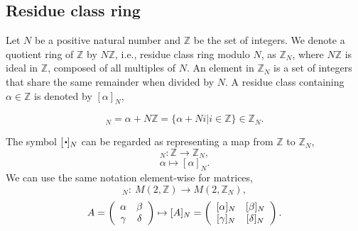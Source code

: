 \documentclass[12pt]{iopart}
\newcommand{\sbt}{\,\begin{picture}(-1,1)(-1,-3)\circle*{2}\end{picture}\ }
\newcommand{\deq}{\stackrel{\rm{\tiny def}}{=}}
\begin{document}
%

\subsection{Residue class ring}
Let \(N\) be a positive natural number and \(\mathbb Z\) be the set of integers.
We denote a quotient ring of \(\mathbb Z\) by \(N\mathbb Z\),
i.e., residue class ring modulo \(N\),
as \(\mathbb Z_N\),
where \(N\mathbb Z\) is ideal in \(\mathbb Z\), composed of
all multiples of \(N\).
%
An element in \(\mathbb Z_N\) is a set of integers that share the same remainder
when divided by \(N\).
A residue class containing \(\alpha\in\mathbb Z\) is denoted by \([\alpha]_N\),

\begin{equation}
[\alpha]_N=\alpha+N\mathbb Z=\{\alpha+Ni|i\in\mathbb Z\}\in\mathbb Z_N.
\end{equation}

The symbol \([\sbt]_N\) can be regarded as representing a map from \(\mathbb Z\) to \(\mathbb Z_N\),
\begin{equation}
[\sbt]_N: \mathbb Z\longrightarrow\mathbb Z_N,
\end{equation}
\begin{equation}
\alpha\longmapsto[\alpha]_N.%
\end{equation}
%
%
We can use the same notation element-wise for matrices,
\begin{equation}
[\sbt]_N:\ M(2,\mathbb Z)\rightarrow M(2,\mathbb Z_N),
\end{equation}
\begin{equation}
A
=
\left(\begin{array}{cc}
\alpha & \beta \\
\gamma & \delta \\
\end{array}\right)
\mapsto[A]_N
=
\left(\begin{array}{cc}
[\alpha]_N & [\beta]_N \\\relax
[\gamma]_N & [\delta]_N \\
\end{array}\right).
\end{equation}
\end{document}
